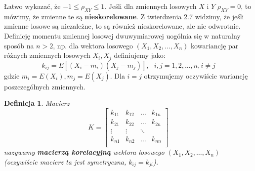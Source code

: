 \documentclass[10pt,a4paper]{article}
\newtheorem{definition}{Definicja}[section]
\begin{document}
Łatwo wykazać, że $-1\leq \rho_{XY} \leq 1$. Jeśli dla zmiennych losowych $X$ i $Y$ $\rho_{XY} = 0$, to mówimy, że zmienne te są
\textbf{nieskorelowane}.
Z twierdzenia 2.7 widzimy, że jeśli zmienne losowe są niezależne, to są również nieskorelowane, ale nie odwrotnie. Definicję momentu 
zmiennej losowej dwuwymiarowej uogólnia się w naturalny sposób na $n>2$, np. dla wektora losowego $(X_1, X_2, ..., X_n)$ kowariancję par
różnych zmiennych losowych $X_i,X_j$ definiujemy jako:
\begin{equation}
k_{ij}=E[(X_i-m_i)(X_j-m_j)],~~~i,j=1,2,...,n, i\neq j
\end{equation}
gdzie $m_i = E(X_i), m_j = E(X_j)$.
Dla $i=j$ otrzymujemy oczywiście wariancję poszczególnych zmiennych.
\begin{definition}
Macierz 
\begin{equation}
K = \left[ \begin{array}{llll}
k_{11} & k_{12} & \ldots &k_{1n} \\
k_{21} & k_{22} & \ldots &k_{2n} \\
\vdots & \vdots & \ddots \\
k_{n1} & k_{n2} & \ldots &k_{nn} \\
\end{array} \right]
\end{equation}
nazywamy \textbf{macierzą korelacyjną} wektora losowego $(X_1,X_2,\ldots,X_n)$ (oczywiście macierz ta jest symetryczna, $k_{ij}=k_{ji}$).
\end{definition}
\end{document}
